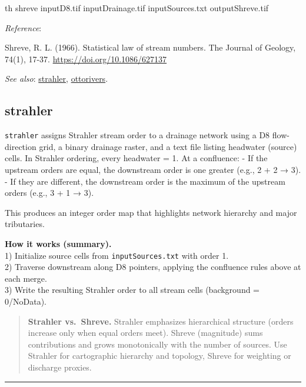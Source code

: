 \documentclass[
]{book}
\newenvironment{Shaded}{\begin{snugshade}}{\end{snugshade}}
\newcommand{\ExtensionTok}[1]{#1}
\newcommand{\NormalTok}[1]{#1}
\begin{document}
\begin{Shaded}
\begin{Highlighting}[]
\ExtensionTok{th}\NormalTok{ shreve inputD8.tif inputDrainage.tif inputSources.txt outputShreve.tif}
\end{Highlighting}
\end{Shaded}

\emph{Reference}:

Shreve, R. L. (1966). Statistical law of stream numbers. The Journal of Geology, 74(1), 17-37. \url{https://doi.org/10.1086/627137}

\emph{See also}: \hyperref[strahler]{strahler}, \hyperref[ottorivers]{ottorivers}.

\subsection{strahler}\label{strahler}

\texttt{strahler} assigns Strahler stream order to a drainage network using a D8 flow-direction grid, a binary drainage raster, and a text file listing headwater (source) cells. In Strahler ordering, every headwater = 1. At a confluence:
- If the upstream orders are equal, the downstream order is one greater (e.g., 2 + 2 → 3).
- If they are different, the downstream order is the maximum of the upstream orders (e.g., 3 + 1 → 3).

This produces an integer order map that highlights network hierarchy and major tributaries.

\textbf{How it works (summary).}\\
1) Initialize source cells from \texttt{inputSources.txt} with order 1.\\
2) Traverse downstream along D8 pointers, applying the confluence rules above at each merge.\\
3) Write the resulting Strahler order to all stream cells (background = 0/NoData).

\begin{quote}
\textbf{Strahler vs.~Shreve.} Strahler emphasizes hierarchical structure (orders increase only when equal orders meet). Shreve (magnitude) sums contributions and grows monotonically with the number of sources. Use Strahler for cartographic hierarchy and topology, Shreve for weighting or discharge proxies.
\end{quote}

\begin{center}\rule{0.5\linewidth}{0.5pt}\end{center}
\end{document}
